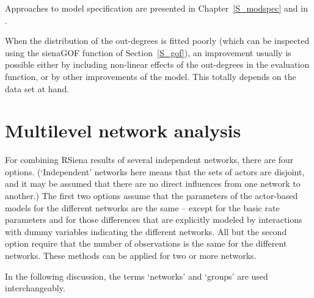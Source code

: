 \documentclass[a4paper,fleqn,11pt]{article}
\newcommand{\+}{\, + \,}
\newcommand{\RS}{{\sf \textsf{RSiena} }}
\begin{document}
Approaches to model specification are presented in Chapter~\ref{S_modspec}
and in \citet*{SnijdersEA10b}.

When the distribution of the out-degrees is fitted poorly
(which can be inspected using the \textsf{sienaGOF} function
of Section~\ref{S_gof}), an improvement
usually is possible either by including non-linear effects of the
out-degrees in the evaluation function, or by other improvements of the model.
This totally depends on the data set at hand.


\newpage
\section{Multilevel network analysis}
\label{S_mulev}

For combining \RS results of several independent networks,
there are four options.
(`Independent'  networks here means that the sets of actors are
disjoint, and it may be assumed that there are no direct influences
from one network to another.)
The first two options assume that the parameters
of the actor-based models for the different
networks are the same -- except
for the basic rate parameters and for
those differences that are explicitly modeled by interactions
with dummy variables indicating the different networks.
All but the second option require that the number of observations
is the same for the different networks.
These methods can be applied for two or more networks.
\medskip

In the following discussion,
the terms `networks' and `groups' are used interchangeably.
\end{document}
